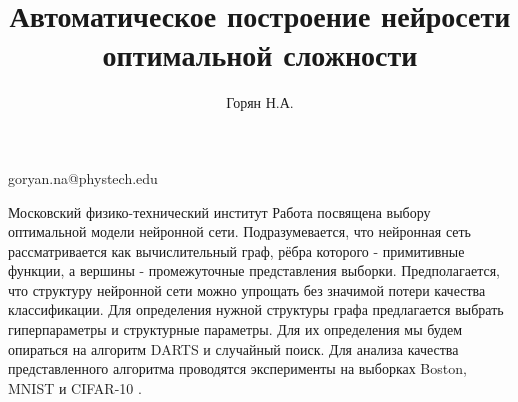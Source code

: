 \documentclass[12pt,twoside]{article}
\begin{document}
\title
    {Автоматическое построение нейросети оптимальной сложности}
\author
    {Горян Н.А. }%
\email
    {goryan.na@phystech.edu}

\organization
    {Московский физико-технический институт}
\abstract
	{Работа посвящена выбору оптимальной модели нейронной сети. Подразумевается, что нейронная сеть рассматривается как вычислительный граф, рёбра которого - примитивные функции, а вершины - промежуточные представления выборки. Предполагается, что структуру нейронной сети можно упрощать без значимой потери качества классификации. Для определения нужной структуры графа предлагается выбрать     гиперпараметры и структурные параметры. Для их определения мы будем опираться на алгоритм DARTS и случайный поиск. Для анализа качества представленного алгоритма проводятся эксперименты на выборках Boston, MNIST и CIFAR-10 .}
\maketitle
\end{document}
